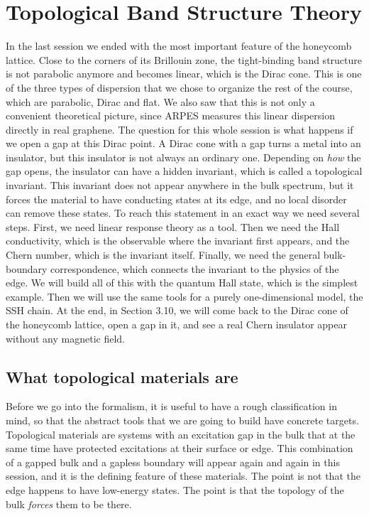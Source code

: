 \chapter{Topological Band Structure Theory}

In the last session we ended with the most important feature of the honeycomb lattice. Close to the
corners of its Brillouin zone, the tight-binding band structure is not parabolic anymore and becomes
linear, which is the Dirac cone. This is one of the three types of dispersion that we chose to
organize the rest of the course, which are parabolic, Dirac and flat. We also saw that this is not
only a convenient theoretical picture, since ARPES measures this linear dispersion directly in real
graphene. The question for this whole session is what happens if we open a gap at this Dirac point.
A Dirac cone with a gap turns a metal into an insulator, but this insulator is not always an ordinary
one. Depending on \emph{how} the gap opens, the insulator can have a hidden invariant, which is called
a topological invariant. This invariant does not appear anywhere in the bulk spectrum, but it forces
the material to have conducting states at its edge, and no local disorder can remove these states.
To reach this statement in an exact way we need several steps. First, we need linear response theory
as a tool. Then we need the Hall conductivity, which is the observable where the invariant first
appears, and the Chern number, which is the invariant itself. Finally, we need the general
bulk-boundary correspondence, which connects the invariant to the physics of the edge. We will build
all of this with the quantum Hall state, which is the simplest example. Then we will use the same
tools for a purely one-dimensional model, the SSH chain. At the end, in Section 3.10, we will come
back to the Dirac cone of the honeycomb lattice, open a gap in it, and see a real Chern insulator
appear without any magnetic field.

\section{What topological materials are}

Before we go into the formalism, it is useful to have a rough classification in mind, so that the
abstract tools that we are going to build have concrete targets. Topological materials are systems
with an excitation gap in the bulk that at the same time have protected excitations at their surface
or edge. This combination of a gapped bulk and a gapless boundary will appear again and again in this
session, and it is the defining feature of these materials. The point is not that the edge happens to
have low-energy states. The point is that the topology of the bulk \emph{forces} them to be there.

